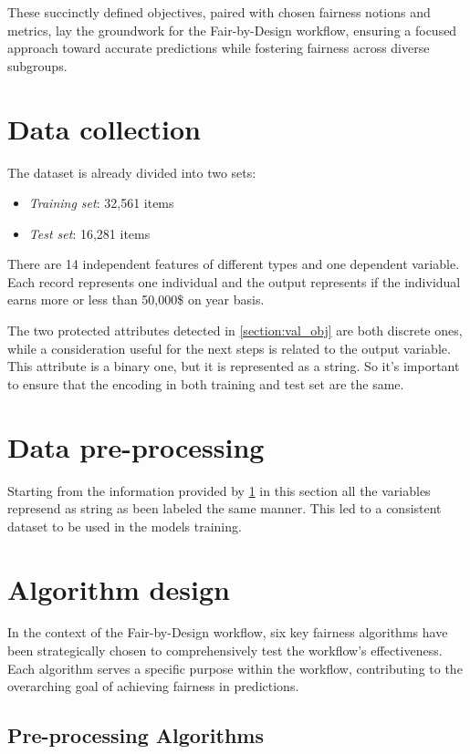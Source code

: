 These succinctly defined objectives, paired with chosen fairness notions and metrics, lay the groundwork for the Fair-by-Design workflow, ensuring a focused approach toward accurate predictions while fostering fairness across diverse subgroups.

\section{Data collection}
\label{section:val_dc}

The dataset is already divided into two sets:
\begin{itemize}
    \item \emph{Training set}: 32,561 items
    \item \emph{Test set}: 16,281 items
\end{itemize}

There are 14 independent features of different types and one dependent variable. Each record represents one individual and the output represents if the individual earns more or less than 50,000\$ on year basis.

The two protected attributes detected in \cref{section:val_obj} are both discrete ones, while a consideration useful for the next steps is related to the output variable. This attribute is a binary one, but it is represented as a string. So it's important to ensure that the encoding in both training and test set are the same.

\section{Data pre-processing}

Starting from the information provided by \cref{section:val_dc} in this section all the variables represend as string as been labeled the same manner. This led to a consistent dataset to be used in the models training.

\section{Algorithm design}

In the context of the Fair-by-Design workflow, six key fairness algorithms have been strategically chosen to comprehensively test the workflow's effectiveness. Each algorithm serves a specific purpose within the workflow, contributing to the overarching goal of achieving fairness in predictions.

\subsection{Pre-processing Algorithms}

